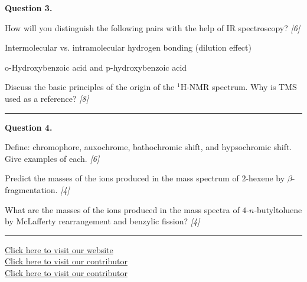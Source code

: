 \documentclass[11pt,a4paper]{article}
\newcommand{\pts}[1]{\hfill   \textit{[#1]}}
\begin{document}
\noindent   \textbf{Question 3.}

\begin{parts}
  \item How will you distinguish the following pairs with the help of IR spectroscopy? \pts{6}
  
\begin{parts}
    \item Intermolecular vs. intramolecular hydrogen bonding (dilution effect)
    \item $ \text{o}$-Hydroxybenzoic acid and $ \text{p}$-hydroxybenzoic acid
  \end{parts}
  \item Discuss the basic principles of the origin of the $^1 \text{H}$-NMR spectrum. Why is TMS used as a reference? \pts{8}
\end{parts}

\medskip\rule{\linewidth}{0.2pt}




\noindent   \textbf{Question 4.}

\begin{parts}
  \item Define: chromophore, auxochrome, bathochromic shift, and hypsochromic shift. Give examples of each. \pts{6}
  \item Predict the masses of the ions produced in the mass spectrum of $2$-hexene by $\beta$-fragmentation. \pts{4}
  \item What are the masses of the ions produced in the mass spectra of $4$-$n$-butyltoluene by McLafferty rearrangement and benzylic fission? \pts{4}
\end{parts}

\vfill
\rule{\linewidth}{0.4pt}

\begin{center}\small
  \href{https://bhu-exam.vercel.app/}{Click here to visit our website}\\[4pt]
  \href{https://me-aryan.vercel.app/}{Click here to visit our contributor}\\[4pt]
  \href{https://quashan-me.vercel.app/}{Click here to visit our contributor}
\end{center}
\end{document}
